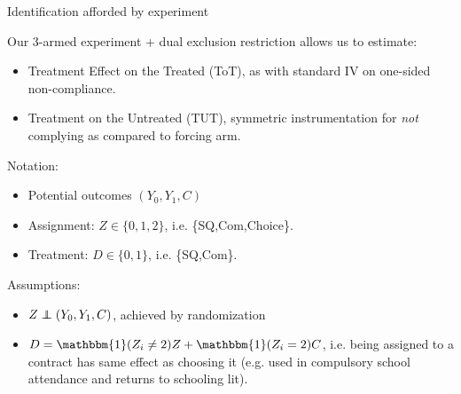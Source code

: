 \documentclass[8pt]{beamer}
\begin{document}
 
\begin{frame}{Identification afforded by experiment}

Our 3-armed experiment + dual exclusion restriction allows us to estimate: 
\begin {itemize}
 \item Treatment Effect on the Treated (ToT), as with standard IV on one-sided non-compliance.
 \item Treatment on the Untreated (TUT), symmetric instrumentation for \textit{not} complying as compared to forcing arm.
\end{itemize}
\vspace{.2in}
Notation: 
\begin{itemize}
    \item Potential outcomes $(Y_0,Y_1,C)$
    \item Assignment: $Z \in \{0,1,2\}$, i.e. \{SQ,Com,Choice\}.  
    \item Treatment: $D \in \{0,1\} $, i.e. \{SQ,Com\}.
\end{itemize}

\vspace{.2in}

Assumptions:

\begin{itemize}
    \item $Z \independent (Y_0,Y_1,C)$, achieved by randomization
    \item $D = \mathbbm{1}(Z_i \neq 2) Z + \mathbbm{1}(Z_i=2) C$, i.e. \alert{being assigned to a contract has same effect as choosing it} (e.g. used in compulsory school attendance and returns to schooling lit).
\end{itemize}
\end{frame}
\end{document}

